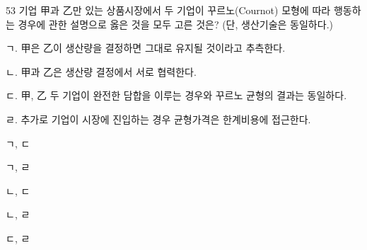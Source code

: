 \begin{question}{53}
기업 甲과 乙만 있는 상품시장에서 두 기업이 꾸르노(Cournot) 모형에 따라 행동하는 경우에 관한 설명으로 옳은 것을 모두 고른 것은? (단, 생산기술은 동일하다.)
\begin{framedtext}
ㄱ. 甲은 乙이 생산량을 결정하면 그대로 유지될 것이라고 추측한다. \par
ㄴ. 甲과 乙은 생산량 결정에서 서로 협력한다. \par
ㄷ. 甲, 乙 두 기업이 완전한 담합을 이루는 경우와 꾸르노 균형의 결과는 동일하다. \par
ㄹ. 추가로 기업이 시장에 진입하는 경우 균형가격은 한계비용에 접근한다. \par
\end{framedtext}
\begin{choices}
  \item ㄱ, ㄷ
  \item ㄱ, ㄹ
  \item ㄴ, ㄷ
  \item ㄴ, ㄹ
  \item ㄷ, ㄹ
\end{choices}
\end{question}
